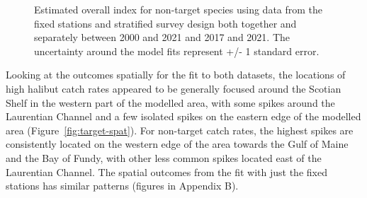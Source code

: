 \documentclass[12pt]{article}\usepackage[]{graphicx}\usepackage[]{color}
\begin{document}
\begin{figure}[htb]

{\centering {}  

}

\caption{Estimated overall index for non-target species using data from the fixed stations and stratified survey design both together and separately between 2000 and 2021 and 2017 and 2021. The uncertainty around the model fits represent +/- 1 standard error.}\label{fig:non-t-indices}
\end{figure}
Looking at the outcomes spatially for the fit to both datasets, the locations of high halibut catch rates appeared to be generally focused around the Scotian Shelf in the western part of the modelled area, with some spikes around the Laurentian Channel and a few isolated spikes on the eastern edge of the modelled area (Figure~\ref{fig:target-spat}). For non-target catch rates, the highest spikes are consistently located on the western edge of the area towards the Gulf of Maine and the Bay of Fundy, with other less common spikes located east of the Laurentian Channel. The spatial outcomes from the fit with just the fixed stations has similar patterns (figures in Appendix B).
\end{document}
